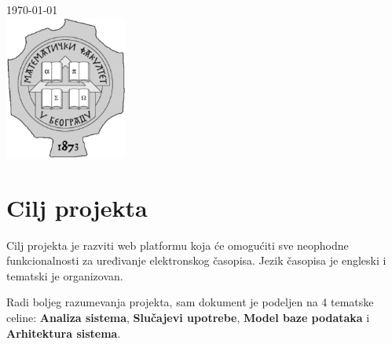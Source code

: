 \documentclass[a4paper]{article}
\begin{document}
\begin{titlepage}

\mydate
{\large \today}\\[2cm] %


\includegraphics[width=40mm]{logo.jpg}\\[1cm] %
 

\vfill %

\end{titlepage}


\tableofcontents
\newpage

\section{Cilj projekta}
\label{section:ciljprojekta}

Cilj projekta je razviti web platformu koja će omogućiti sve neophodne funkcionalnosti za uređivanje elektronskog časopisa. Jezik časopisa je engleski i tematski je organizovan.

Radi boljeg razumevanja projekta, sam dokument je podeljen na 4 tematske celine: \textbf{Analiza sistema}, \textbf{Slučajevi upotrebe}, \textbf{Model baze podataka} i \textbf{Arhitektura sistema}.
\end{document}
